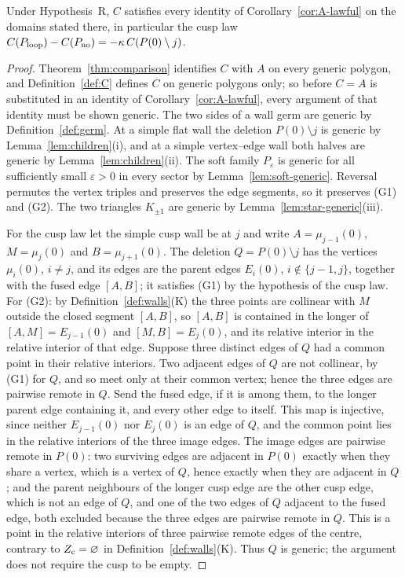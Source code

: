 \begin{corollary}\label{cor:C-inherits}
Under Hypothesis~R, $C$ satisfies every identity of
Corollary~\ref{cor:A-lawful} on the domains stated there, in particular
the cusp law
$C(P_{\rm loop})-C(P_{\rm no})=-\kappa\,C(P(0)\setminus j)$.
\end{corollary}
\begin{proof}
Theorem~\ref{thm:comparison} identifies $C$ with $A$ on every generic
polygon, and Definition~\ref{def:C} defines $C$ on generic polygons only;
so before $C=A$ is substituted in an identity of
Corollary~\ref{cor:A-lawful}, every argument of that identity must be
shown generic. The two sides of a wall germ are generic by
Definition~\ref{def:germ}. At a simple flat wall the deletion
$P(0)\setminus j$ is generic by Lemma~\ref{lem:children}(i), and at a
simple vertex--edge wall both halves are generic by
Lemma~\ref{lem:children}(ii). The soft family $P_\varepsilon$ is generic
for all sufficiently small $\varepsilon>0$ in every sector by
Lemma~\ref{lem:soft-generic}. Reversal permutes the vertex triples and
preserves the edge segments, so it preserves (G1) and (G2). The two
triangles $K_{\pm1}$ are generic by Lemma~\ref{lem:star-generic}(iii).

For the cusp law let the simple cusp wall be at $j$ and write
$A=\mu_{j-1}(0)$, $M=\mu_j(0)$ and $B=\mu_{j+1}(0)$. The deletion
$Q=P(0)\setminus j$ has the vertices $\mu_i(0)$, $i\neq j$, and its edges
are the parent edges $E_i(0)$, $i\notin\{j-1,j\}$, together with the fused
edge $[A,B]$; it satisfies (G1) by the hypothesis of the cusp law. For (G2):
by Definition~\ref{def:walls}(K) the three points are collinear with $M$
outside the closed segment $[A,B]$, so $[A,B]$ is contained in the longer of
$[A,M]=E_{j-1}(0)$ and $[M,B]=E_j(0)$, and its relative interior in the
relative interior of that edge. Suppose three distinct edges of $Q$ had a
common point in their relative interiors. Two adjacent edges of $Q$ are not
collinear, by (G1) for $Q$, and so meet only at their common vertex; hence
the three edges are pairwise remote in $Q$. Send the fused edge, if it is
among them, to the longer parent edge containing it, and every other edge
to itself. This map is injective, since neither $E_{j-1}(0)$ nor $E_j(0)$
is an edge of $Q$, and the common point lies in the relative interiors of
the three image edges. The image edges are pairwise remote in $P(0)$: two
surviving edges are adjacent in $P(0)$ exactly when they share a vertex,
which is a vertex of $Q$, hence exactly when they are adjacent in $Q$; and
the parent neighbours of the longer cusp edge are the other cusp edge,
which is not an edge of $Q$, and one of the two edges of $Q$ adjacent to
the fused edge, both excluded because the three edges are pairwise remote
in $Q$. This is a point in the relative interiors of three pairwise remote
edges of the centre, contrary to $Z_{\rm c}=\varnothing$ in
Definition~\ref{def:walls}(K). Thus $Q$ is generic; the argument does not
require the cusp to be empty.


\end{proof}
